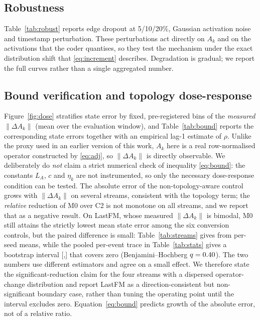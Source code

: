 \documentclass[preprint,12pt]{elsarticle}
\begin{document}
\subsection{Robustness}

Table~\ref{tab:robust} reports edge dropout at 5/10/20\%, Gaussian activation noise and timestamp perturbation. These perturbations act directly on $A_k$ and on the activations that the coder quantises, so they test the mechanism under the exact distribution shift that \eqref{eq:increment} describes. Degradation is gradual; we report the full curves rather than a single aggregated number.

\subsection{Bound verification and topology dose-response}

Figure~\ref{fig:dose} stratifies state error by fixed, pre-registered bins of the \emph{measured} $\|\Delta A_k\|$ (mean \MeanDeltaA{} over the evaluation window), and Table~\ref{tab:bound} reports the corresponding state errors together with an empirical lag-1 estimate of $\rho$. Unlike the proxy used in an earlier version of this work, $A_k$ here is a real row-normalised operator constructed by \eqref{eq:adj}, so $\|\Delta A_k\|$ is directly observable. We deliberately do \emph{not} claim a strict numerical check of inequality \eqref{eq:bound}: the constants $L_A$, $c$ and $\eta_k$ are not instrumented, so only the necessary dose-response condition can be tested. The absolute error of the non-topology-aware control grows with $\|\Delta A_k\|$ on several streams, consistent with the topology term; the \emph{relative} reduction of M0 over C2 is not monotone on all streams, and we report that as a negative result. On LastFM, whose measured $\|\Delta A_k\|$ is bimodal, M0 still attains the strictly lowest mean state error among the six conversion controls, but the paired difference is small: Table~\ref{tab:streams} gives \RedLastfm{} from per-seed means, while the pooled per-event trace in Table~\ref{tab:stats} gives a bootstrap interval [\CILastfmLo{},\CILastfmHi{}] that covers zero (Benjamini--Hochberg $q=0.40{}$). The two numbers use different estimators and agree on a small effect. We therefore state the significant-reduction claim for the four streams with a dispersed operator-change distribution and report LastFM as a direction-consistent but non-significant boundary case, rather than tuning the operating point until the interval excludes zero. Equation~\eqref{eq:bound} predicts growth of the absolute error, not of a relative ratio.
\end{document}
